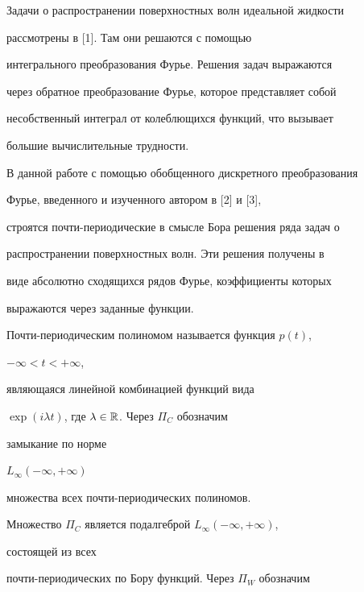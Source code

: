 \maketitle 


\label{begin} 


 


 


Задачи о распространении поверхностных волн идеальной жидкости 


рассмотрены в [1]. Там они решаются с помощью 


интегрального преобразования Фурье. Решения задач выражаются 


через обратное преобразование Фурье, которое представляет собой 


несобственный интеграл от колеблющихся функций, что вызывает 


большие вычислительные трудности. 


 


В данной работе с помощью обобщенного дискретного преобразования 


Фурье, введенного и изученного автором в [2] и [3], 


строятся почти-периодические в смысле Бора решения ряда задач о 


распространении поверхностных волн. Эти решения получены в 


виде абсолютно сходящихся рядов Фурье, коэффициенты которых 


выражаются через заданные функции. 


 


Почти-периодическим полиномом называется функция $p(t)$, 


$-\infty<t<+\infty$, 


являющаяся линейной комбинацией функций вида 


$\exp(i\lambda t)$, где $\lambda\in\Bbb R$. Через $\Pi_C$ обозначим 


замыкание по норме 


$L_\infty(-\infty,+\infty)$ 


множества всех почти-периодических полиномов. 


Множество $\Pi_C$ является подалгеброй $L_\infty(-\infty,+\infty)$, 


состоящей из всех 


почти-периодических по Бору функций. Через $\Pi_W$ обозначим 


